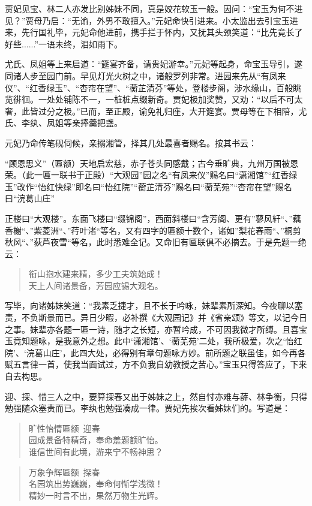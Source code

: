\documentclass[12pt,oneside]{book}
\newenvironment{shici}{%
\begin{verse}%
\centering\large\hspace{12pt}}%
{\end{verse}}
\begin{document}
贾妃见宝、林二人亦发比别姊妹不同，真是姣花软玉一般。因问：“宝玉为何不进见？”贾母乃启：“无谕，外男不敢擅入。”元妃命快引进来。小太监出去引宝玉进来，先行国礼毕，元妃命他进前，携手拦于怀内，又抚其头颈笑道：“比先竟长了好些......”一语未终，泪如雨下。

尤氏、凤姐等上来启道：“筵宴齐备，请贵妃游幸。”元妃等起身，命宝玉导引，遂同诸人步至园门前。早见灯光火树之中，诸般罗列非常。进园来先从“有凤来仪”、“红香绿玉”、“杏帘在望”、“蘅芷清芬”等处，登楼步阁，涉水缘山，百般眺览徘徊。一处处铺陈不一，一桩桩点缀新奇。贾妃极加奖赞，又劝：“以后不可太奢，此皆过分之极。”已而，至正殿，谕免礼归座，大开筵宴。贾母等在下相陪，尤氏、李纨、凤姐等亲捧羹把盏。

元妃乃命传笔砚伺候，亲搦湘管，择其几处最喜者赐名。按其书云：

“顾恩思义”（匾额）天地启宏慈，赤子苍头同感戴；古今垂旷典，九州万国被恩荣。（此一匾一联书于正殿）“大观园”园之名“有凤来仪”赐名曰“潇湘馆”“红香绿玉”改作“怡红快绿”即名曰“怡红院”“蘅芷清芬”赐名曰“蘅芜苑”“杏帘在望”赐名曰“浣葛山庄”

正楼曰“大观楼”。东面飞楼曰“缀锦阁”，西面斜楼曰“含芳阁、更有”蓼风轩“、”藕香榭“、”紫菱洲“、”荇叶渚“等名，又有四字的匾额十数个，诸如”梨花春雨“、”桐剪秋风“、”荻芦夜雪“等名，此时悉难全记。又命旧有匾联俱不必摘去。于是先题一绝云：

\begin{shici}
衔山抱水建来精，多少工夫筑始成！\\
天上人间诸景备，芳园应锡大观名。
\end{shici}


写毕，向诸姊妹笑道：“我素乏捷才，且不长于吟咏，妹辈素所深知。今夜聊以塞责，不负斯景而已。异日少暇，必补撰《大观园记》并《省亲颂》等文，以记今日之事。妹辈亦各题一匾一诗，随才之长短，亦暂吟成，不可因我微才所缚。且喜宝玉竟知题咏，是我意外之想。此中‘潇湘馆’、‘蘅芜苑’二处，我所极爱，次之‘怡红院’、‘浣葛山庄’，此四大处，必得别有章句题咏方妙。前所题之联虽佳，如今再各赋五言律一首，使我当面试过，方不负我自幼教授之苦心。”宝玉只得答应了，下来自去构思。

迎、探、惜三人之中，要算探春又出于姊妹之上，然自忖亦难与薛、林争衡，只得勉强随众塞责而已。李纨也勉强凑成一律。贾妃先挨次看姊妹们的。写道是：

\begin{shici}
旷性怡情匾额~迎春\\
园成景备特精奇，奉命羞题额旷怡。\\
谁信世间有此境，游来宁不畅神思？
\end{shici}

\begin{shici}
万象争辉匾额~探春\\
名园筑出势巍巍，奉命何惭学浅微！\\
精妙一时言不出，果然万物生光辉。
\end{shici}
\end{document}
